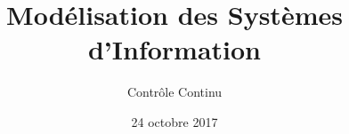 \title{
    Modélisation des Systèmes d'Information
}
\author{
	Contrôle Continu
}
\date{24 octobre 2017}
